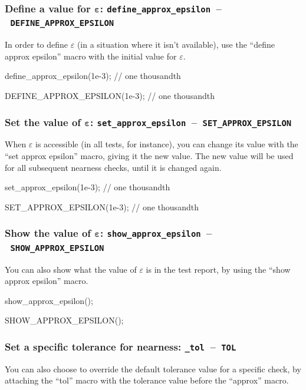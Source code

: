 \documentclass[twoside, a4paper, article]{memoir}
\newcommand*\testudocolor{\color{red!80!blue}}
\newcommand*\testudo[1]{\texttt{\testudocolor{}#1}}
\newcommand*\testudopair[2]{\testudo{#1}~--~\testudo{#2}}
\newcommand\subsubsectiontestudopair[3]{%
  \subsubsection[#1]{#1: \testudopair{#2}{#3}}}
\begin{document}
\subsubsectiontestudopair{Define a value for $\bm{\varepsilon}$}%
  {define\_approx\_epsilon}{DEFINE\_APPROX\_EPSILON}
\label{sec:define-value-epsilon}

In order to define $\varepsilon$ (in a situation where it isn't available), use
the ``define approx epsilon'' macro with the initial value for $\varepsilon$.

\begin{cpplisting}
define_approx_epsilon(1e-3); // one thousandth
\end{cpplisting}

\begin{cpplisting}
DEFINE_APPROX_EPSILON(1e-3); // one thousandth
\end{cpplisting}

\subsubsectiontestudopair{Set the value of $\bm{\varepsilon}$}%
  {set\_approx\_epsilon}{SET\_APPROX\_EPSILON}
\label{sec:set-value-epsilon}

When $\varepsilon$ is accessible (in all tests, for instance), you can change
its value with the ``set approx epsilon'' macro, giving it the new value.  The
new value will be used for all subsequent nearness checks, until it is changed
again.

\begin{cpplisting}
set_approx_epsilon(1e-3); // one thousandth
\end{cpplisting}

\begin{cpplisting}
SET_APPROX_EPSILON(1e-3); // one thousandth
\end{cpplisting}

\subsubsectiontestudopair{Show the value of $\bm{\varepsilon}$}%
  {show\_approx\_epsilon}{SHOW\_APPROX\_EPSILON}
\label{sec:show-value-epsilon}

You can also show what the value of $\varepsilon$ is in the test report, by
using the ``show approx epsilon'' macro.

\begin{cpplisting}
show_approx_epsilon();
\end{cpplisting}

\begin{cpplisting}
SHOW_APPROX_EPSILON();
\end{cpplisting}

\subsubsectiontestudopair{Set a specific tolerance for nearness}%
  {\_tol}{TOL}
\label{sec:specify-tolerance-nearness}

You can also choose to override the default tolerance value for a specific
check, by attaching the ``tol'' macro with the tolerance value before the
``approx'' macro.
\end{document}
